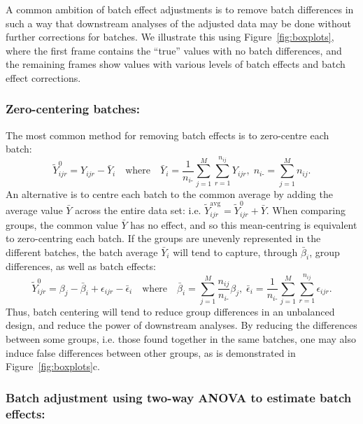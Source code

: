 \documentclass{bio}
\begin{document}
A common ambition of batch effect adjustments is to remove batch differences in such a way that downstream analyses of the adjusted data may be done without further corrections for batches. We illustrate this using Figure~\ref{fig:boxplots}, where the first frame contains the ``true'' values with no batch differences, and the remaining frames show values with various levels of batch effects and batch effect corrections.

\subsubsection{Zero-centering batches:}

The most common method for removing batch effects is to zero-centre each batch:
\begin{equation}
\tilde{Y}^0_{ijr}=Y_{ijr}-\bar{Y}_{i}
\quad\text{where}\quad
\bar{Y}_i=\frac{1}{n_{i\textrm{-}}} \sum_{j=1}^M\sum_{r=1}^{n_{ij}} Y_{ijr},\;
n_{i\textrm{-}}=\sum_{j=1}^M n_{ij}.
\end{equation}
An alternative is to centre each batch to the common average by adding the average value $\bar{Y}$ across the entire data set: i.e. $\tilde{Y}^{\textrm{avg}}_{ijr}=\tilde{Y}^0_{ijr}+\bar{Y}$. When comparing groups, the common value $\bar{Y}$ has no effect, and so this mean-centring is equivalent to zero-centring each batch. If the groups are unevenly represented in the different batches, the batch average $\bar{Y}_i$ will tend to capture, through $\bar\beta_i$, group differences, as well as batch effects:
\begin{equation}
\tilde{Y}^0_{ijr}=\beta_j-\bar{\beta}_i+\epsilon_{ijr}-\bar{\epsilon}_i
\quad\text{where}\quad
\bar{\beta}_i={\sum_{j=1}^M \frac{n_{ij}}{n_{i\textrm{-}}}\beta_j},\;
\bar{\epsilon}_i=\frac{1}{n_{i\textrm{-}}} \sum_{j=1}^M\sum_{r=1}^{n_{ij}} \epsilon_{ijr}.
\end{equation}
Thus, batch centering will tend to reduce group differences in an unbalanced design, and reduce the power of downstream analyses. By reducing the differences between some groups, i.e. those found together in the same batches, one may also induce false differences between other groups, as is demonstrated in Figure~\ref{fig:boxplots}c.

\subsubsection{Batch adjustment using two-way ANOVA to estimate batch effects:}
\end{document}
